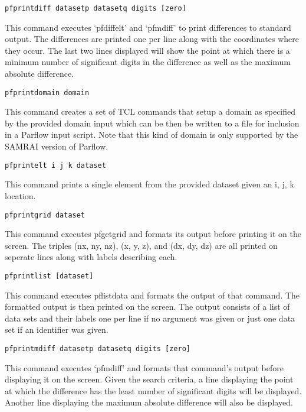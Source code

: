 \begin{description}
\item{\begin{verbatim}pfprintdiff datasetp datasetq digits [zero]\end{verbatim}}
This command executes `pfdiffelt' and `pfmdiff' to print differences
to standard output.  The differences are printed one per line along
with the coordinates where they occur.  The last two lines displayed
will show the point at which there is a minimum number of significant
digits in the difference as well as the maximum absolute difference.


\item{\begin{verbatim}pfprintdomain domain\end{verbatim}} This command
 creates a set of TCL commands that setup a domain as specified by the
 provided domain input which can be then be written to a file for
 inclusion in a Parflow input script.  Note that this kind of domain
 is only supported by the SAMRAI version of Parflow.

\item{\begin{verbatim}pfprintelt i j k dataset\end{verbatim}}
This command prints a single element from the provided dataset given an i, j, k location.

\item{\begin{verbatim}pfprintgrid dataset\end{verbatim}}
This command executes pfgetgrid and formats its output before printing
it on the screen.  The triples (nx, ny, nz), (x, y, z), and
(dx, dy, dz) are all printed on seperate lines along with labels
describing each.


\item{\begin{verbatim}pfprintlist [dataset]\end{verbatim}}
This command executes pflistdata and formats the output of that
command.  The formatted output is then printed on the screen.  The
output consists of a list of data sets and their labels one per line
if no argument was given or just one data set if an identifier was
given.


\item{\begin{verbatim}pfprintmdiff datasetp datasetq digits [zero]\end{verbatim}}
This command executes `pfmdiff' and formats that command's output
before displaying it on the screen.  Given the search criteria, a line
displaying the point at which the difference has the least number of
significant digits will be displayed.  Another line displaying the
maximum absolute difference will also be displayed.



\end{description}
